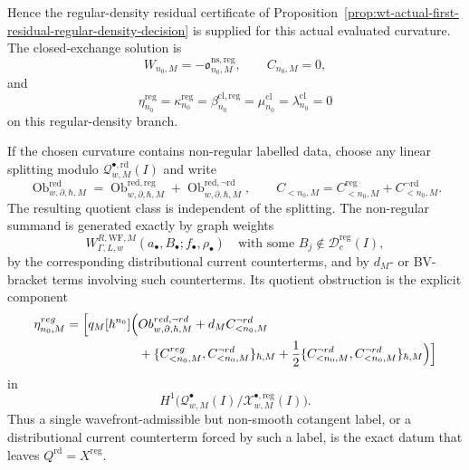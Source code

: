 \begin{prop}
  Hence the regular-density residual certificate of
  Proposition~\ref{prop:wt-actual-first-residual-regular-density-decision}
  is supplied for this actual evaluated curvature.  The closed-exchange
  solution is
  \[
    W_{n_0,M}
      =
    -\mathfrak o^{\mathrm{ns,reg}}_{n_0,M},
    \qquad
    C_{n_0,M}=0,
  \]
  and
  \[
    \eta^{\mathrm{reg}}_{n_0}
      =
    \kappa^{\mathrm{reg}}_{n_0}
      =
    \beta^{\mathrm{cl},\mathrm{reg}}_{n_0}
      =
    \mu^{\mathrm{cl}}_{n_0}
      =
    \lambda^{\mathrm{cl}}_{n_0}
      =
    0
  \]
  on this regular-density branch.

  If the chosen curvature contains non-regular labelled data, choose any
  linear splitting modulo
  \(\mathcal Q^{\bullet,\mathrm{rd}}_{w,M}(I)\) and write
  \[
    \operatorname{Ob}^{\mathrm{red}}_{w,\partial,\hbar,M}
      =
    \operatorname{Ob}^{\mathrm{red,reg}}_{w,\partial,\hbar,M}
      +
    \operatorname{Ob}^{\mathrm{red},\neg\mathrm{rd}}_{w,\partial,\hbar,M},
    \qquad
    C_{<n_0,M}
      =
    C^{\mathrm{reg}}_{<n_0,M}
      +
    C^{\neg\mathrm{rd}}_{<n_0,M}.
  \]
  The resulting quotient class is independent of the splitting.  The
  non-regular summand is generated exactly by graph weights
  \[
    W^{R,\mathrm{WF},M}_{\Gamma,L,w}
      (a_\bullet,B_\bullet;f_\bullet,\rho_\bullet)
      \quad\text{with some }B_j\notin\mathcal D^{\mathrm{reg}}_c(I),
  \]
  by the corresponding distributional current counterterms, and by
  \(d_M\)- or BV-bracket terms involving such counterterms.  Its quotient
  obstruction is the explicit component
  \[
  \begin{aligned}
    \eta^{\mathrm{reg}}_{n_0,M}
      =
      \Bigl[
      q_M[\hbar^{n_0}]\Bigl(
        &\operatorname{Ob}^{\mathrm{red},\neg\mathrm{rd}}_{w,\partial,\hbar,M}
        +d_MC^{\neg\mathrm{rd}}_{<n_0,M} \\
        &+\{C^{\mathrm{reg}}_{<n_0,M},
             C^{\neg\mathrm{rd}}_{<n_0,M}\}_{\hbar,M}
        +\frac12
          \{C^{\neg\mathrm{rd}}_{<n_0,M},
             C^{\neg\mathrm{rd}}_{<n_0,M}\}_{\hbar,M}
      \Bigr)\Bigr]
  \end{aligned}
  \]
  in
  \[
    H^1\bigl(
      \mathcal Q^\bullet_{w,M}(I)/
      \mathcal X^{\bullet,\mathrm{reg}}_{w,M}(I)
    \bigr).
  \]
  Thus a single wavefront-admissible but non-smooth cotangent label, or a
  distributional current counterterm forced by such a label, is the exact
  datum that leaves \(Q^{\mathrm{rd}}=X^{\mathrm{reg}}\).
\end{prop}

